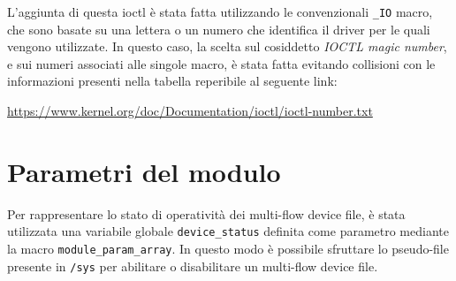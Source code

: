 \documentclass{article}
\begin{document}
L'aggiunta di questa ioctl è stata fatta utilizzando le convenzionali \texttt{\_IO} macro, che sono basate su una lettera o un numero che identifica il driver per le quali vengono utilizzate. In questo caso, la scelta sul cosiddetto \textsl{IOCTL magic number}, e sui numeri associati alle singole macro, è stata fatta evitando collisioni con le informazioni presenti nella tabella reperibile al seguente link:
\begin{center}
\url{https://www.kernel.org/doc/Documentation/ioctl/ioctl-number.txt}
\end{center}

\section{Parametri del modulo}
Per rappresentare lo stato di operatività dei multi-flow device file, è stata utilizzata una variabile globale \texttt{device\_status} definita come parametro mediante la macro \texttt{module\_param\_array}. In questo modo è possibile sfruttare lo pseudo-file presente in \texttt{/sys} per abilitare o disabilitare un multi-flow device file.
\end{document}
